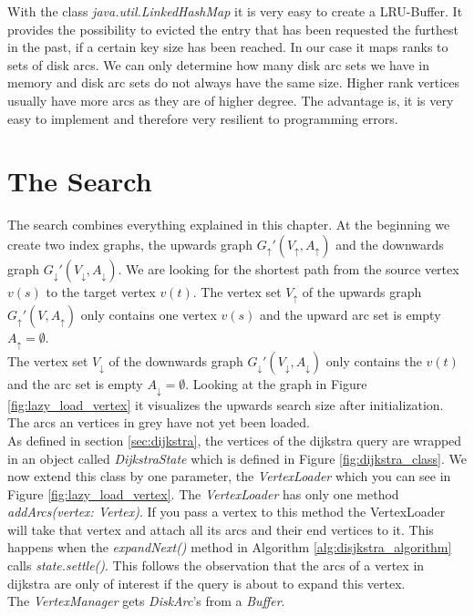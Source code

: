 With the class \textit{java.util.LinkedHashMap} it is very easy to create a LRU-Buffer.
It provides the possibility to evicted the entry that has been requested the furthest in the past, if a certain key size has been reached.
In our case it maps ranks to sets of disk arcs.
We can only determine how many disk arc sets we have in memory and disk arc sets do not always have the same size.
Higher rank vertices usually have more arcs as they are of higher degree.
The advantage is, it is very easy to implement and therefore very resilient to programming errors.

\section{The Search}

The search combines everything explained in this chapter.
At the beginning we create two index graphs, the upwards graph $G_\uparrow'(V_\uparrow, A_\uparrow)$ and the downwards graph $G_\downarrow'(V_\downarrow, A_\downarrow)$.
We are looking for the shortest path from the source vertex $v(s)$ to the target vertex $v(t)$.
The vertex set $V_\uparrow$ of the upwards graph $G_\uparrow'(V, A_\uparrow)$ only contains one vertex $v(s)$ and the upward arc set is empty $A_\uparrow = \emptyset$.
\\
The vertex set $V_\downarrow$ of the downwards graph $G_\downarrow'(V_\downarrow, A_\downarrow)$ only contains the $v(t)$ and the arc set is empty $A_\downarrow = \emptyset$.
Looking at the graph in Figure \ref{fig:lazy_load_vertex} it visualizes the upwards search size after initialization.
The arcs an vertices in grey have not yet been loaded.
\\
As defined in section \ref{sec:dijkstra}, the vertices of the dijkstra query are wrapped in an object called \textit{DijkstraState} which is defined in Figure \ref{fig:dijkstra_class}.
We now extend this class by one parameter, the \textit{VertexLoader} which you can see in Figure \ref{fig:lazy_load_vertex}.
The \textit{VertexLoader} has only one method \textit{addArcs(vertex: Vertex)}.
If you pass a vertex to this method the VertexLoader will take that vertex and attach all its arcs and their end vertices to it.
This happens when the \textit{expandNext()} method in Algorithm \ref{alg:disjkstra_algorithm} calls \textit{state.settle()}.
This follows the observation that the arcs of a vertex in dijkstra are only of interest if the query is about to expand this vertex.
\\
The \textit{VertexManager} gets \textit{DiskArc}'s from a \textit{Buffer}.
